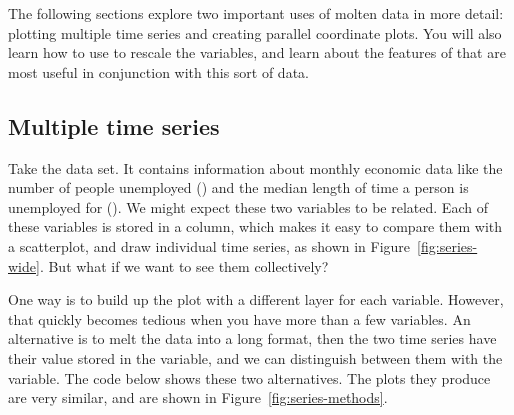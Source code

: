 The following sections explore two important uses of molten data in more detail: plotting multiple time series and creating parallel coordinate plots. You will also learn how to use  to rescale the variables, and learn about the features of \ggplot that are most useful in conjunction with this sort of data.

\subsection{Multiple time series}
\label{sub:time-series}

Take the  data set.  It contains information about monthly economic data like the number of people unemployed () and the median length of time a person is unemployed for ().  We might expect these two variables to be related.  Each of these variables is stored in a column, which makes it easy to compare them with a scatterplot, and draw individual time series, as shown in Figure~\ref{fig:series-wide}.  But what if we want to see them collectively?

% 


One way is to build up the plot with a different layer for each variable.   However, that quickly becomes tedious when you have more than a few variables.  An alternative is to melt the data into a long format, then the two time series have their value stored in the  variable, and we can distinguish between them with the  variable.  The code below shows these two alternatives.  The plots they produce are very similar, and are shown in Figure~\ref{fig:series-methods}.

% 
%


